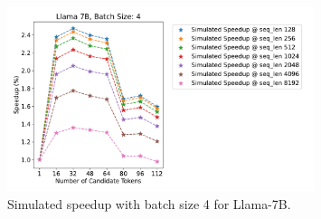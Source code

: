 \documentclass{article}
\theoremstyle{plain}
\theoremstyle{definition}
\theoremstyle{remark}
\begin{document}
\begin{figure}[h]
    \centering
    \includegraphics[width=0.8\textwidth]{llama7b-sim-allseq.pdf}
    \caption{Simulated speedup with batch size 4 for Llama-7B.}
    \label{fig:llama7b-sim-allseq}
\end{figure}
\end{document}
